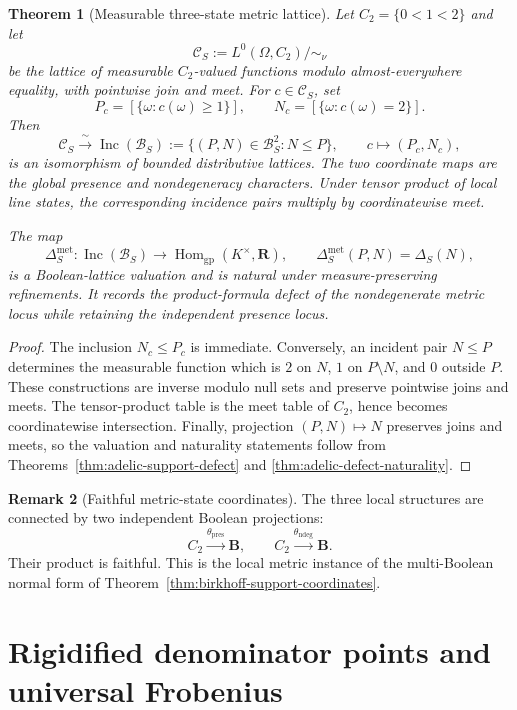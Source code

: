 \documentclass[11pt]{amsart}
\numberwithin{equation}{section}
\newtheorem{theorem}{Theorem}[section]
\theoremstyle{definition}
\newtheorem{remark}[theorem]{Remark}
\newcommand{\B}{\mathbf B}
\newcommand{\R}{\mathbf R}
\newcommand{\Hom}{\operatorname{Hom}}
\begin{document}
\begin{theorem}[Measurable three-state metric lattice]
\label{thm:global-three-state-metric-lattice}
Let $C_2=\{0<1<2\}$ and let
\[
\mathscr C_S
:=L^0(\Omega,C_2)/{\sim_\nu}
\]
be the lattice of measurable $C_2$-valued functions modulo almost-everywhere
equality, with pointwise join and meet.  For $c\in\mathscr C_S$, set
\[
P_c=[\{\omega:c(\omega)\geq1\}],
\qquad
N_c=[\{\omega:c(\omega)=2\}].
\]
Then
\[
\boxed{
\mathscr C_S
\xrightarrow{\ \sim\ }
\operatorname{Inc}(\mathscr B_S)
:=\{(P,N)\in\mathscr B_S^2:N\leq P\},
\qquad
c\longmapsto(P_c,N_c),
}
\]
is an isomorphism of bounded distributive lattices.  The two coordinate
maps are the global presence and nondegeneracy characters.  Under tensor
product of local line states, the corresponding incidence pairs multiply
by coordinatewise meet.

The map
\[
\Delta_S^{\mathrm{met}}:
\operatorname{Inc}(\mathscr B_S)
\longrightarrow\Hom_{\mathrm{gp}}(K^\times,\R),
\qquad
\Delta_S^{\mathrm{met}}(P,N)=\Delta_S(N),
\]
is a Boolean-lattice valuation and is natural under measure-preserving
refinements.  It records the product-formula defect of the nondegenerate
metric locus while retaining the independent presence locus.
\end{theorem}

\begin{proof}
The inclusion $N_c\leq P_c$ is immediate.  Conversely, an incident pair
$N\leq P$ determines the measurable function which is $2$ on $N$, $1$
on $P\setminus N$, and $0$ outside $P$.  These constructions are inverse
modulo null sets and preserve pointwise joins and meets.  The tensor-product
table is the meet table of $C_2$, hence becomes coordinatewise intersection.
Finally, projection $(P,N)\mapsto N$ preserves joins and meets, so the
valuation and naturality statements follow from
Theorems~\ref{thm:adelic-support-defect} and
\ref{thm:adelic-defect-naturality}.
\end{proof}

\begin{remark}[Faithful metric-state coordinates]
The three local structures are connected by two independent Boolean
projections:
\[
C_2\xrightarrow{\theta_{\mathrm{pres}}}\B,
\qquad
C_2\xrightarrow{\theta_{\mathrm{ndeg}}}\B.
\]
Their product is faithful.  This is the local metric instance of the
multi-Boolean normal form of Theorem~\ref{thm:birkhoff-support-coordinates}.
\end{remark}


\section{Rigidified denominator points and universal Frobenius}
\label{sec:rigidified-denominators}
\end{document}
